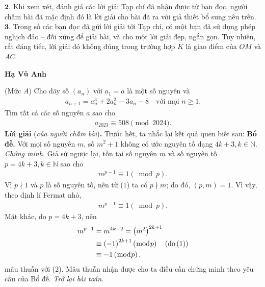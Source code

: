 \begin{multicols}{2}
	\vskip 0.05cm
	$\pmb{2.}$ Khi xem xét, đánh giá các lời giải Tạp chí đã nhận được từ bạn đọc, người chấm bài đã mặc định đó là lời giải cho bài đã ra với giả thiết bổ sung nêu trên.
	\vskip 0.05cm
	$\pmb{3.}$ Trong số các bạn đọc đã gửi lời giải tới Tạp chí, có một bạn đã sử dụng phép nghịch đảo -- đối xứng để giải bài, và cho một lời giải đẹp, ngắn gọn. Tuy nhiên, rất đáng tiếc, lời giải đó không đúng trong trường hợp $K$ là giao điểm của $OM$ và $AC$.
	\begin{flushright}
		\textbf{\color{thachthuctoanhoc}Hạ Vũ Anh}
	\end{flushright}
	{}
	(Mức $A$) Cho dãy số $(a_n)$ với $a_1=a$ là một số nguyên và 
	\begin{align*}
		a_{n+1}=a_n^3+2a_n^2-3a_n-8\quad\text{với mọi $n\ge1$.}
	\end{align*}
	Tìm tất cả các số nguyên $a$  sao cho 
	\begin{align*}
		a_{2023}\equiv508\pmod{2024}.
	\end{align*}
	\textbf{\color{thachthuctoanhoc}Lời giải} (\textit{của người chấm bài})\textbf{\color{thachthuctoanhoc}.}
	\vskip 0.05cm
	Trước hết, ta nhắc lại kết quả quen biết sau:
	\vskip 0.05cm
	\textbf{\color{thachthuctoanhoc}Bổ đề.} Với mọi số nguyên $m$, số $m^2 + 1$  không có ước nguyên tố dạng $4k + 3, k \in \mathbb{N}$.
	\vskip 0.05cm 
	\textit{Chứng minh.} Giả sử ngược lại, tồn tại số nguyên $m$ và số nguyên tố $p = 4k + 3, k \in \mathbb{N}$ sao cho
	\begin{align*}
		{m^{p - 1}} \equiv 1\left( {\bmod p} \right). \tag{$2$}
	\end{align*}
	Vì $p \nmid 1$   và $p$ là số nguyên tố, nên từ ($1$) ta có  $p \nmid m$; do đó, $(p, m) = 1$. Vì vậy, theo định lí Fermat nhỏ,
	\begin{align*}
		{m^{p - 1}} \equiv 1\left( {\bmod p} \right). \tag{$2$}
	\end{align*}
	Mặt khác, do $p = 4k + 3$, nên
	\begin{align*}
			{m^{p - 1}} &= {m^{4k + 2}} = {\left( {{m^2}} \right)^{2k + 1}} \\
			&\equiv {\left( { - 1} \right)^{2k + 1}}\left( {\bmod p} \right)\quad\left( {{\rm{do}}\left( 1 \right)} \right)\\
			&\equiv  - 1\left( {\bmod p} \right),
	\end{align*}
	mâu thuẫn với ($2$).
	\vskip 0.05cm
	Mâu thuẫn nhận được cho ta điều cần chứng minh theo yêu cầu của Bổ đề.
	\vskip 0.05cm
	\textit{Trở lại bài toán.}

\end{multicols}

